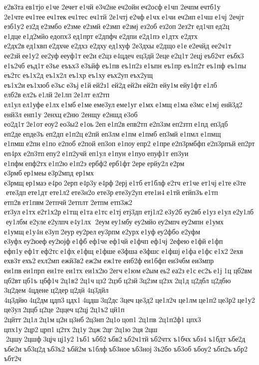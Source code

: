 е2в3та ев1тјо е1че 	2ечет е1чй 
е3ч2не еч2ойн еч2осф е1чп 	2ечпм ечтб1у 
2е1чте еч1тее еч1тек еч1тес 	еч1тй 
2е1чтј е2чф е1чх е1чи 	еч2ип е1чш е1чј 	2ечјт 
езб1у2 ез2д е2змбо 	е2зме 	е2змй 	е2змп 	е2змј 	ез2об 	ез2оп 2ез2т 	ед1чп ед2ц 	е1дце е1д2мйо едопх3 ед1прт е2дпфч 	е2дпи 
е2д1пэ 	е1дтх 
е2дтх  
е2дх2в ед1хвп е2дхче 	е2дхз 	е2дху ед1хуф 
2е3дхы 	е2дщо е1е е2ечйд 
ее2ч1т 	ее2зй ее1у2 	ее2уф ееуф1т ее2и е2цз е4цдеч 	ец3дй 2еце е2ц1т 2ецј еъб2чт 	еъбх3 
е1ъ2чб 	еъд1т е3ъе 	еъъх3 	е3ъйф 	еъ1пв 
еъ1п2з 	е1ъпн 	еъ1пр 
еъ1п2т 	еъ1пф 	еъ1пы 	еъ2тс 
еъ1х2д 
еъ1х2л 	еъ1хр 	еъ1ху еъх2уп еъх2ущ 
еъ1х2и еъ1хюб е3ъс е3ъј е1й ей2з1 ей2д ей2н ей2п 	ейу1м ейу1фт е1лб 	елб2в ел2ъ е1лй 2е1лп 2е1лт 	ел2тп 	ел1ул ел1уфе е1лх е1мб е1ме еме3ул еме1уг е1мх е1мщ е1ма е3мс е1мј 
енй3д2 	енй3л 	енп1у 	2енхц е2ню 	2енщу 	е2ншд е3об 
ео2д1т 2е1от еоу2 ео3ы2 е1оь 2еп е1п2в епв2тп 
е2п3зм еп2зтп е1пд 	еп3дб 	еп2де епде3ъ 	еп2дп е1п2ц е2пй 	еп3лм е1пм  	е1пмб 	еп3мй 	е1пмл 	е1пмщ 	е1пмш е2пн е1по  	е2поб 	е2пой 	еп3оп 	е1поу епр2 	е1пре е2п3рмбфп е2п3рпъй 	еп2рт 	еп4рх 
е2п3тп епу2 е1п2учй 	еп1ул 	е1пун 	е1пуо епуф1т 	еп3уи 	е1пфм епф2тх е1п2ю е1п2э 	ербф2 ерб1фт 2ере ерйу2л е2рм 	е3рмб ер1меы е3р2мпд 	ер1мх 	е3рмщ ер1маэ е4ро 2ерп е4р3у е4рф 2ерј е1тб ет1блф е2тч 	ет1че 	ет1чј е1те е3те  ете3дп ете1дт 
ете1л2 ете3н2о 	ете3р ете3у2уп 
ете1и4 е1тй етйп3ъ е1тп 	етп2в ет1пвм 2етпчй 2етплт 	2етпм 
етп3ж2 	ет3ул е1тх е2т1х2р е1тщ е1та е1тс е1тј етј3дп 
етј1л2 е3у2б 	еу2вб е1уз е1ул е2у1лб  еу1лбм 	е2уле е2улпч е4у1лх  2еум еу1мбу еу2мйо еу2мпч еу2мпн 	е1умх 	е1умщ е1у4н е3уп 2еур еу2рел еу3рпм 	е2урх е1уф еу2фбо 	е2уфм 	е3уфх еу2юеф еу2юјф е1фб 	еф1че 	еф1чй 	е1фчп 	еф1чј 	2ефею е1фй е1фп 	ефп1у еф1т 	еф2тс е1фх е1фщ 	е1фше 	е3фша 	е3фшс 	е1фшј е1фа е1фс е1х2 2ехв 	ехв3т ехъ2 ехл2мп 
ежй3в2 еж2м 	еж1те 	еиб2ф еи1бфп еи3чбм еи3мпр 	еи1пв еи1прп 	еи1те 	еи1тх 
еи1х2ю 2егч е1юм е2ым еь2 еа2з е1с ес2ъ е1ј 1ц 	цб2вм 	цб2вт цб1ъ 	цбф1ч 2ц1в2 2ц1ч цз2 2цзб ц2зй 3ц2зм ц2зх 2ц1д 	ц2дбл 	ц2дбю 
3ц2дем 4цдене 	ц2дер ц2дй 
4ц3дйл 
4ц3дйю 4ц2дм цдп3 цдх1 4цдш 3ц2дс 3цеч це3д2 
це1л2ч 	це1лм це1п2 це3р2 це1у2 	це3ул 2ццб ц2це 	2ццеч ц2цј 2ц1ъ2 цй1п 	2цйтт 2ц1л 2ц1м ц2н ц3нб 2ц3нп 2ц1о цоп1 2ц1пв 
2ц1п2ф1 цпх3 	цпх1у 2цр2 црп1 ц2тх 2ц1у 2цж 2цг 2ц1ю 2ця 2цш  2цшу 2цшф 3цјч цј1у2 1ъб1 ъбб2 ъбв2 ъб2ч1тй ъб2чтх 	ъ1бчх ъбз4 	ъ1бдт 	ъбе2д 	ъбе2и 
ъб3ц2д ъб3ъ2 	ъбй2м 	ъ1блф ъб3ное ъб3ној 3ъ2бо 	ъб3об 	ъбоу2 	ъбп2ъ ъбр2 	ъбт2ч 
